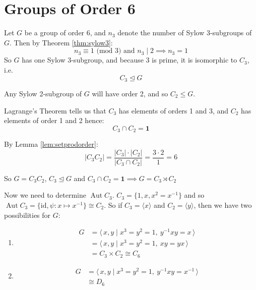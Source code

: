 \documentclass[a4paper, oneside, 12pt, final]{article}
\theoremstyle{definition}
\DeclareMathOperator{\Aut}{Aut}
\begin{document}
\section{Groups of Order 6}
Let \(G\) be a group of order 6, and \(n_3\) denote the number of Sylow
3-subgroups of \(G\).
Then by Theorem \ref{thm:sylow3}:
\[n_3 \equiv 1 \text{ (mod 3) and } n_3 \mid 2 \implies n_3 = 1\]
So \(G\) has one Sylow 3-subgroup, and because 3 is prime, it is isomorphic to
\(C_3\), i.e.
\[C_3 \unlhd G\]

Any Sylow 2-subgroup of \(G\) will have order 2, and so \(C_2 \leqslant G\).

Lagrange's Theorem tells us that \(C_3\) has elements of orders 1 and 3, and
\(C_2\) has elements of order 1 and 2 hence:
\[C_3 \cap C_2 = \bm{1}\]

By Lemma \ref{lem:setprodorder}:
\[|C_3 C_2| = \frac{|C_3| \cdot |C_2|}{|C_3 \cap C_2|} = \frac{3 \cdot 2}{1} =
6\]

So \(G = C_3 C_2\), \(C_3 \unlhd G\) and \(C_3 \cap C_2 = \bm{1} \implies G =
C_3 \rtimes C_2\)

Now we need to determine \(\Aut{C_3}\).
\(C_3 = \{1, x, x^2 = x^{-1}\}\) and so \(\Aut{C_3} = \{\text{id}, \psi:x
\mapsto x^{-1}\} \cong C_2\).
So if \(C_3 = \langle x \rangle\) and \(C_2 = \langle y \rangle\), then we have
two possibilities for \(G\):
\begin{enumerate}
    \item
        \begin{equation*}
        \begin{aligned}
            G &= \langle\, x, y \mid x^3 = y^2 = 1,\ y^{-1}xy = x \,\rangle \\
            &=\langle\, x, y \mid x^3 = y^2 = 1,\ xy = yx \,\rangle \\
            &= C_3 \times C_2 \cong C_6
        \end{aligned}
        \end{equation*}
    \item
        \begin{equation*}
        \begin{aligned}
            G &= \langle\, x, y \mid x^3 = y^2 = 1,\ y^{-1}xy = x^{-1}
            \,\rangle \\
            &\cong D_6
        \end{aligned}
        \end{equation*}
\end{enumerate}
\end{document}
